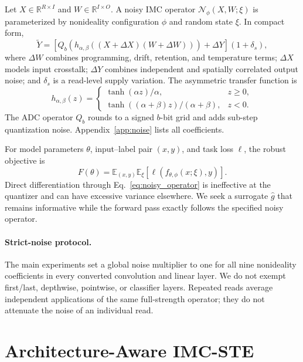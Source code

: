 \documentclass[10pt,twocolumn,letterpaper]{article}
\newcommand{\E}{\mathbb{E}}
\newcommand{\R}{\mathbb{R}}
\begin{document}
Let $X\in\R^{R\times I}$ and $W\in\R^{I\times O}$.  A noisy IMC operator
$\mathcal{N}_{\phi}(X,W;\xi)$ is parameterized by nonideality configuration
$\phi$ and random state $\xi$.  In compact form,
\begin{equation}
  \widetilde{Y}
  = \left[Q_b\!\left(h_{\alpha,\beta}
      ((X+\Delta X)(W+\Delta W))\right)
      + \Delta Y\right](1+\delta_s),
  \label{eq:noisy_operator}
\end{equation}
where $\Delta W$ combines programming, drift, retention, and temperature
terms; $\Delta X$ models input crosstalk; $\Delta Y$ combines independent and
spatially correlated output noise; and $\delta_s$ is a read-level supply
variation.  The asymmetric transfer function is
\begin{equation}
h_{\alpha,\beta}(z)=
\begin{cases}
\tanh(\alpha z)/\alpha, & z\geq 0,\\
\tanh((\alpha+\beta)z)/(\alpha+\beta), & z<0.
\end{cases}
\label{eq:saturation}
\end{equation}
The ADC operator $Q_b$ rounds to a signed $b$-bit grid and adds sub-step
quantization noise.  Appendix~\ref{app:noise} lists all coefficients.

For model parameters $\theta$, input--label pair $(x,y)$, and task loss
$\ell$, the robust objective is
\begin{equation}
  F(\theta)=\E_{(x,y)}\E_{\xi}
  \left[\ell(f_{\theta,\phi}(x;\xi),y)\right].
  \label{eq:objective}
\end{equation}
Direct differentiation through Eq.~\eqref{eq:noisy_operator} is ineffective at
the quantizer and can have excessive variance elsewhere.  We seek a surrogate
$\widehat{g}$ that remains informative while the forward pass exactly follows
the specified noisy operator.

\paragraph{Strict-noise protocol.}
The main experiments set a global noise multiplier to one for all nine
nonideality coefficients in every converted convolution and linear layer.  We
do not exempt first/last, depthwise, pointwise, or classifier layers.  Repeated
reads average independent applications of the same full-strength operator; they
do not attenuate the noise of an individual read.

\section{Architecture-Aware IMC-STE}
\label{sec:method}
\end{document}

